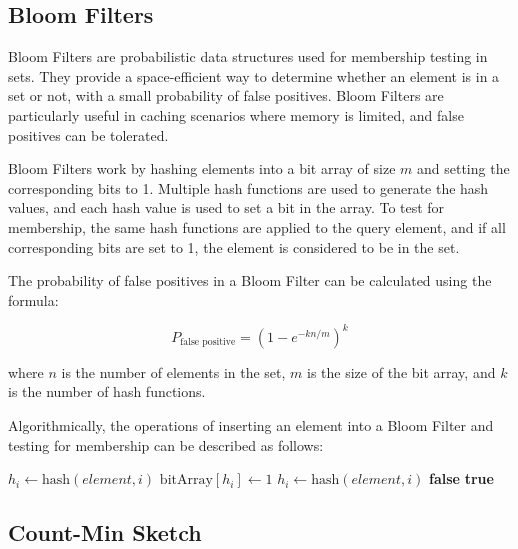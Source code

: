\documentclass[12pt]{book} %
\begin{document}
\subsection{Bloom Filters}

Bloom Filters are probabilistic data structures used for membership testing in sets. They provide a space-efficient way to determine whether an element is in a set or not, with a small probability of false positives. Bloom Filters are particularly useful in caching scenarios where memory is limited, and false positives can be tolerated.

Bloom Filters work by hashing elements into a bit array of size \(m\) and setting the corresponding bits to 1. Multiple hash functions are used to generate the hash values, and each hash value is used to set a bit in the array. To test for membership, the same hash functions are applied to the query element, and if all corresponding bits are set to 1, the element is considered to be in the set.

The probability of false positives in a Bloom Filter can be calculated using the formula:

\[
P_{\text{false positive}} = \left(1 - e^{-kn/m}\right)^k
\]

where \(n\) is the number of elements in the set, \(m\) is the size of the bit array, and \(k\) is the number of hash functions.

Algorithmically, the operations of inserting an element into a Bloom Filter and testing for membership can be described as follows:
\FloatBarrier
\begin{algorithm}[H]
\caption{Bloom Filter Operations}
\begin{algorithmic}[1]
        \State $h_i \gets \text{hash}(element, i)$ 
        \State $\text{bitArray}[h_i] \gets 1$ 
    \EndFor
\EndProcedure
{}
        \State $h_i \gets \text{hash}(element, i)$ 
            \State \Return \textbf{false} 
        \EndIf
    \EndFor
    \State \Return \textbf{true} 
\EndProcedure
\end{algorithmic}
\end{algorithm}
\FloatBarrier

\subsection{Count-Min Sketch}
\end{document}
